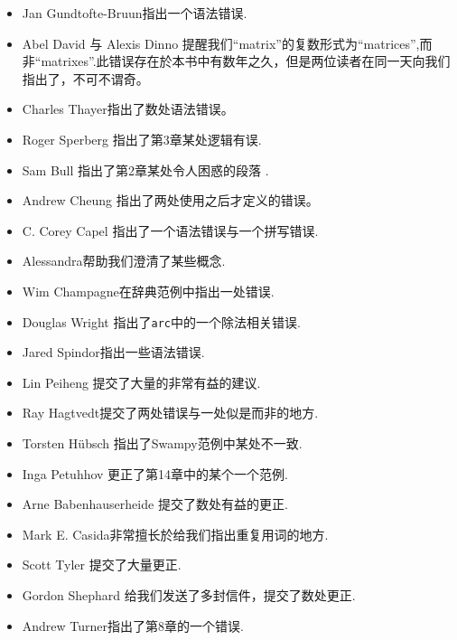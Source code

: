 \begin{itemize}
\item Jan Gundtofte-Bruun指出一个语法错误.

\item Abel David 与 Alexis Dinno 提醒我们``matrix''的复数形式为``matrices'',而非``matrixes''.此错误存在於本书中有数年之久，但是两位读者在同一天向我们指出了，不可不谓奇。

\item Charles Thayer指出了数处语法错误。

\item Roger Sperberg 指出了第3章某处逻辑有误.

\item Sam Bull 指出了第2章某处令人困惑的段落 .

\item Andrew Cheung 指出了两处使用之后才定义的错误。

\item C. Corey Capel 指出了一个语法错误与一个拼写错误.

\item Alessandra帮助我们澄清了某些概念.

\item Wim Champagne在辞典范例中指出一处错误.

\item Douglas Wright 指出了{\tt arc}中的一个除法相关错误.

\item Jared Spindor指出一些语法错误.

\item Lin Peiheng 提交了大量的非常有益的建议.

\item Ray Hagtvedt提交了两处错误与一处似是而非的地方.

\item Torsten H\"{u}bsch 指出了Swampy范例中某处不一致.

\item Inga Petuhhov 更正了第14章中的某个一个范例.

\item Arne Babenhauserheide 提交了数处有益的更正.

\item Mark E. Casida非常擅长於给我们指出重复用词的地方.

\item Scott Tyler 提交了大量更正.

\item Gordon Shephard 给我们发送了多封信件，提交了数处更正.

\item Andrew Turner指出了第8章的一个错误.


\end{itemize}
